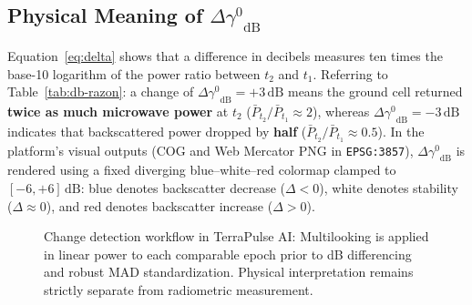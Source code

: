 \documentclass[11pt,a4paper]{article}
\newcommand{\unit}[1]{\mathrm{#1}}
\newcommand{\gz}{\ensuremath{\gamma^{0}}}
\begin{document}
\subsection{Physical Meaning of $\Delta\gz_{\mathrm{dB}}$}

Equation~\eqref{eq:delta} shows that a difference in decibels measures ten times the base-10 logarithm of the power ratio between $t_2$ and $t_1$. Referring to Table~\ref{tab:db-razon}: a change of $\Delta\gz_{\mathrm{dB}} = +3\,\unit{dB}$ means the ground cell returned \textbf{twice as much microwave power} at $t_2$ ($\bar{P}_{t_2}/\bar{P}_{t_1} \approx 2$), whereas $\Delta\gz_{\mathrm{dB}} = -3\,\unit{dB}$ indicates that backscattered power dropped by \textbf{half} ($\bar{P}_{t_2}/\bar{P}_{t_1} \approx 0.5$).
In the platform's visual outputs (COG and Web Mercator PNG in \texttt{EPSG:3857}), $\Delta\gz_{\mathrm{dB}}$ is rendered using a fixed diverging blue--white--red colormap clamped to $[-6, +6]\,\unit{dB}$: blue denotes backscatter decrease ($\Delta < 0$), white denotes stability ($\Delta \approx 0$), and red denotes backscatter increase ($\Delta > 0$).

\begin{figure}[htbp]
\centering
{}
\caption{Change detection workflow in TerraPulse AI: Multilooking is applied in linear power to each comparable epoch prior to dB differencing and robust MAD standardization. Physical interpretation remains strictly separate from radiometric measurement.}
\label{fig:flujo-delta}
\end{figure}
\end{document}
